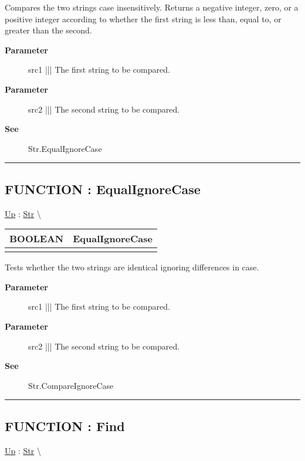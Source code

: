\par
Compares the two strings case insensitively. Returns a negative integer, zero, or a positive integer according to whether the first string is less than, equal to, or greater than the second.

\par
\begin{description}
\item [\textbf{Parameter}] src1 ||| The first string to be compared.
\item [\textbf{Parameter}] src2 ||| The second string to be compared.
\item [\textbf{See}] Str.EqualIgnoreCase
\end{description}

\rule{\linewidth}{0.5pt}
\subsection*{FUNCTION : EqualIgnoreCase}
\hypertarget{ecldoc:str.equalignorecase}{}
\hyperlink{ecldoc:Str}{Up} :
\hspace{0pt} \hyperlink{ecldoc:Str}{Str} \textbackslash 

{\renewcommand{\arraystretch}{1.5}
\begin{tabularx}{\textwidth}{|>{\raggedright\arraybackslash}l|X|}
\hline
\hspace{0pt}BOOLEAN & EqualIgnoreCase \\
\hline
\multicolumn{2}{|>{\raggedright\arraybackslash}X|}{\hspace{0pt}(STRING src1, STRING src2)} \\
\hline
\end{tabularx}
}

\par
Tests whether the two strings are identical ignoring differences in case.

\par
\begin{description}
\item [\textbf{Parameter}] src1 ||| The first string to be compared.
\item [\textbf{Parameter}] src2 ||| The second string to be compared.
\item [\textbf{See}] Str.CompareIgnoreCase
\end{description}

\rule{\linewidth}{0.5pt}
\subsection*{FUNCTION : Find}
\hypertarget{ecldoc:str.find}{}
\hyperlink{ecldoc:Str}{Up} :
\hspace{0pt} \hyperlink{ecldoc:Str}{Str} \textbackslash 

